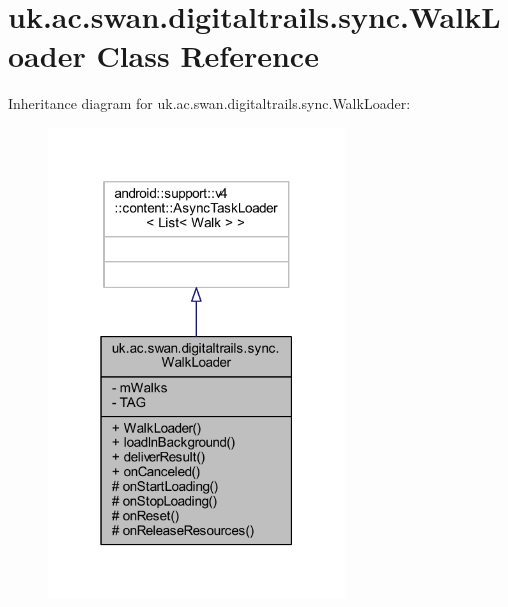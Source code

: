\hypertarget{classuk_1_1ac_1_1swan_1_1digitaltrails_1_1sync_1_1_walk_loader}{\section{uk.\+ac.\+swan.\+digitaltrails.\+sync.\+Walk\+Loader Class Reference}
\label{classuk_1_1ac_1_1swan_1_1digitaltrails_1_1sync_1_1_walk_loader}
}


Inheritance diagram for uk.\+ac.\+swan.\+digitaltrails.\+sync.\+Walk\+Loader\+:
\nopagebreak
\begin{figure}[H]
\begin{center}
\leavevmode
\includegraphics[width=223pt]{classuk_1_1ac_1_1swan_1_1digitaltrails_1_1sync_1_1_walk_loader__inherit__graph}
\end{center}
\end{figure}


